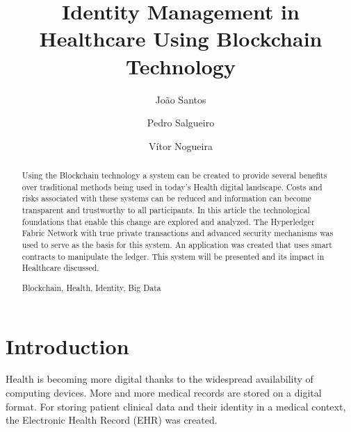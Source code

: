 \documentclass[]{llncs}
\begin{document}
\title{%
Identity Management in Healthcare Using Blockchain Technology}

\author{%
João Santos \and
Pedro Salgueiro \and
Vítor Nogueira}


{\def\addcontentsline#1#2#3{}\maketitle}



\begin{abstract}
Using the Blockchain technology a system can be created to provide several benefits 
over traditional methods being used in today's Health digital landscape. 
Costs and risks associated with these systems can be reduced and information can become 
transparent and trustworthy to all participants. In this article the technological foundations 
that enable this change are explored and analyzed. The Hyperledger Fabric Network with true private 
transactions and advanced security mechanisms was used to serve as the basis for this system.
An application was created that uses smart contracts to manipulate the ledger.
This system will be presented and its impact in Healthcare discussed.

  \begin{keywords}
      Blockchain, Health, Identity, Big Data
  \end{keywords}
\end{abstract}


\section{Introduction}

Health is becoming more digital thanks to the widespread availability of computing devices.
More and more medical records are stored on a digital format. 
For storing patient clinical data and their identity in a medical context, 
the Electronic Health Record (EHR) was created.
 
\end{document}

